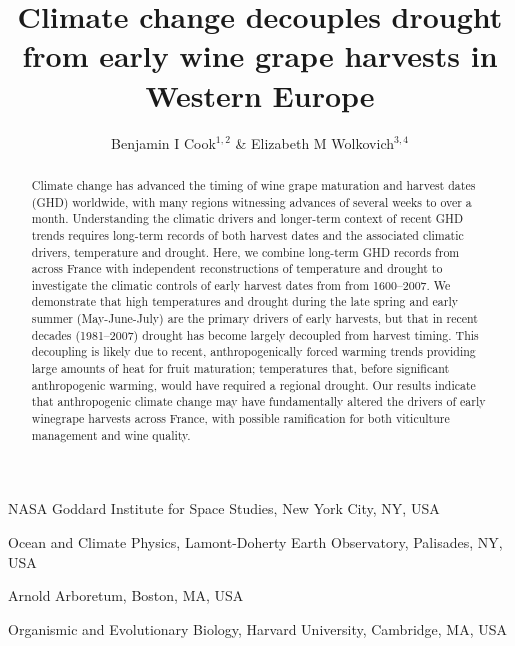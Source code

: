 \documentclass{nature}
\title{Climate change decouples drought from early wine grape harvests in Western Europe}
\author{Benjamin I Cook$^{1,2}$ \& Elizabeth M Wolkovich$^{3,4}$}
\begin{document}
\maketitle

\begin{affiliations}
 \item NASA Goddard Institute for Space Studies, New York City, NY, USA
 \item Ocean and Climate Physics, Lamont-Doherty Earth Observatory, Palisades, NY, USA
 \item Arnold Arboretum, Boston, MA, USA
 \item Organismic and Evolutionary Biology, Harvard University, Cambridge, MA, USA
\end{affiliations}

\begin{abstract}
Climate change has advanced the timing of wine grape maturation and harvest dates (GHD) worldwide, with many regions witnessing advances of several weeks to over a month\cite{Duchene:2005bd,Seguin2005,webb2011}. Understanding the climatic drivers and longer-term context of recent GHD trends requires long-term records of both harvest dates and the associated climatic drivers, temperature and drought. Here, we combine long-term GHD records from across France\cite{Daux2012} with independent reconstructions of temperature\cite{Luterbacher2004} and drought\cite{CookOWDA2015,Pauling2006} to investigate the climatic controls of early harvest dates from from 1600--2007. We demonstrate that high temperatures and drought during the late spring and early summer (May-June-July) are the primary drivers of early harvests, but that in recent decades (1981--2007) drought has become largely decoupled from harvest timing. This decoupling is likely due to recent, anthropogenically forced warming trends providing large amounts of heat for fruit maturation; temperatures that, before significant anthropogenic warming, would have required a regional drought. Our results indicate that anthropogenic climate change may have fundamentally altered the drivers of early winegrape harvests across France, with possible ramification for both viticulture management and wine quality.
\end{abstract}
\end{document}

